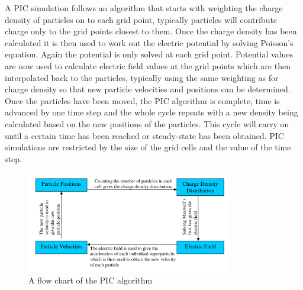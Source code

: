 \documentclass[12pt]{article}
\begin{document}
A PIC simulation follows an algorithm that starts with weighting the charge density of particles on to each grid point, typically particles will contribute charge only to the grid points closest to them. Once the charge density has been calculated it is then used to work out the electric potential by solving Poisson's equation. Again the potential is only solved at each grid point. Potential values are now used to calculate electric field values at the grid points which are then interpolated back to the particles, typically using the same weighting as for charge density so that new particle velocities and positions can be determined. Once the particles have been moved, the PIC algorithm is complete, time is advanced by one time step and the whole cycle repeats with a new density being calculated based on the new positions of the particles. This cycle will carry on until a certain time has been reached or steady-state has been obtained. PIC simulations are restricted by the size of the grid cells and the value of the time step.
\begin{figure}[H]
\centering
\includegraphics[width=0.8\textwidth]{piccycle}
\caption{A flow chart of the PIC algorithm \cite{loop}}
\label{fig:Leapfrog}
\end{figure}
\end{document}
